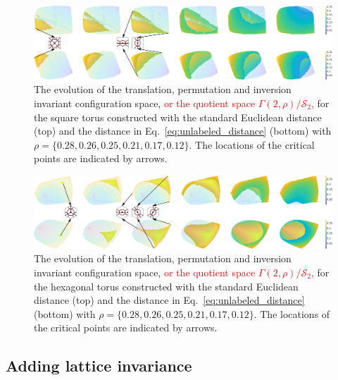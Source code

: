 \documentclass[default,iicol]{sn-jnl}%
\theoremstyle{thmstyleone}%
\theoremstyle{thmstyletwo}%
\theoremstyle{thmstylethree}%
\providecommand{\red}[1]{\textcolor{red}{#1}}
\begin{document}
\begin{figure}
	\centering
	\includegraphics[width=1.0\textwidth]{figure10.eps}
	\caption{The evolution of the translation, permutation and inversion invariant configuration space, \red{or the quotient space $\Gamma(2, \rho) / \mathcal{S}_2$,} for the square torus constructed with the standard Euclidean distance (top) and the distance in Eq.\ \ref{eq:unlabeled_distance} (bottom) with $\rho = \{0.28, 0.26, 0.25, 0.21, 0.17, 0.12\}$. The locations of the critical points are indicated by arrows.}
	\label{fig:figure10}
\end{figure}

\begin{figure}
	\centering
	\includegraphics[width=1.0\textwidth]{figure11.eps}
	\caption{The evolution of the translation, permutation and inversion invariant configuration space, \red{or the quotient space $\Gamma(2, \rho) / \mathcal{S}_2$,} for the hexagonal torus constructed with the standard Euclidean distance (top) and the distance in Eq.\ \ref{eq:unlabeled_distance} (bottom) with $\rho = \{0.28, 0.26, 0.25, 0.21, 0.17, 0.12\}$. The locations of the critical points are indicated by arrows.}
	\label{fig:figure11}
\end{figure}


\subsection{Adding lattice invariance}
\label{subsec:space_translation_permutation_inversion_rotation}
\end{document}
